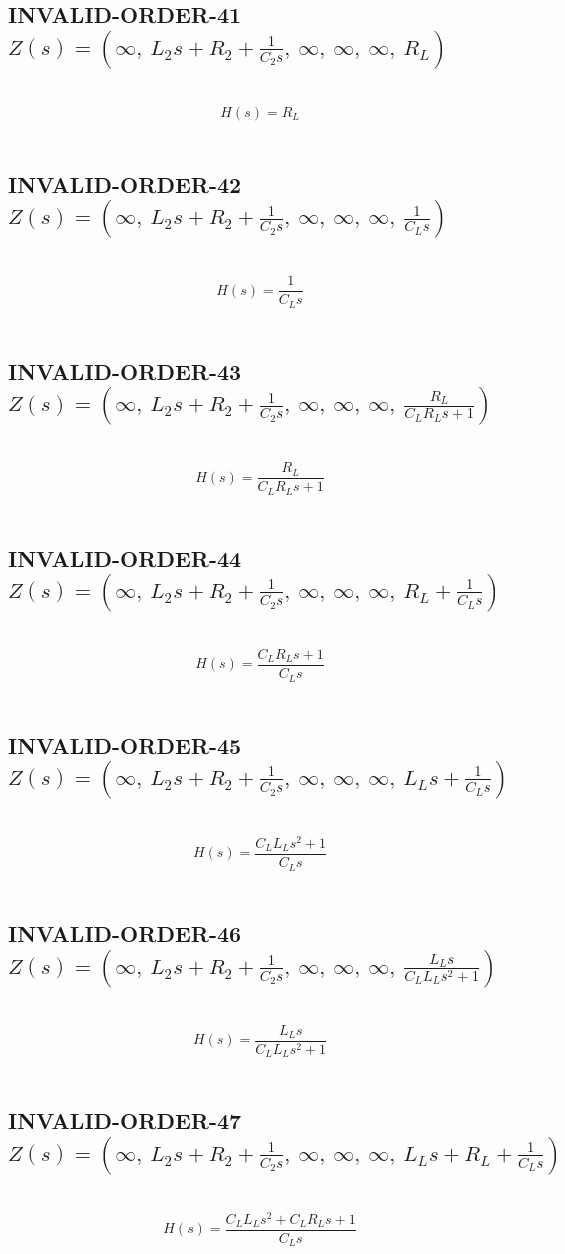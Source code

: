 \documentclass{article}
\begin{document}
\subsection{INVALID-ORDER-41 $Z(s) = \left( \infty, \  L_{2} s + R_{2} + \frac{1}{C_{2} s}, \  \infty, \  \infty, \  \infty, \  R_{L}\right)$ } \ 
\textbf{\[H(s) = R_{L}\] } \ 
\subsection{INVALID-ORDER-42 $Z(s) = \left( \infty, \  L_{2} s + R_{2} + \frac{1}{C_{2} s}, \  \infty, \  \infty, \  \infty, \  \frac{1}{C_{L} s}\right)$ } \ 
\textbf{\[H(s) = \frac{1}{C_{L} s}\] } \ 
\subsection{INVALID-ORDER-43 $Z(s) = \left( \infty, \  L_{2} s + R_{2} + \frac{1}{C_{2} s}, \  \infty, \  \infty, \  \infty, \  \frac{R_{L}}{C_{L} R_{L} s + 1}\right)$ } \ 
\textbf{\[H(s) = \frac{R_{L}}{C_{L} R_{L} s + 1}\] } \ 
\subsection{INVALID-ORDER-44 $Z(s) = \left( \infty, \  L_{2} s + R_{2} + \frac{1}{C_{2} s}, \  \infty, \  \infty, \  \infty, \  R_{L} + \frac{1}{C_{L} s}\right)$ } \ 
\textbf{\[H(s) = \frac{C_{L} R_{L} s + 1}{C_{L} s}\] } \ 
\subsection{INVALID-ORDER-45 $Z(s) = \left( \infty, \  L_{2} s + R_{2} + \frac{1}{C_{2} s}, \  \infty, \  \infty, \  \infty, \  L_{L} s + \frac{1}{C_{L} s}\right)$ } \ 
\textbf{\[H(s) = \frac{C_{L} L_{L} s^{2} + 1}{C_{L} s}\] } \ 
\subsection{INVALID-ORDER-46 $Z(s) = \left( \infty, \  L_{2} s + R_{2} + \frac{1}{C_{2} s}, \  \infty, \  \infty, \  \infty, \  \frac{L_{L} s}{C_{L} L_{L} s^{2} + 1}\right)$ } \ 
\textbf{\[H(s) = \frac{L_{L} s}{C_{L} L_{L} s^{2} + 1}\] } \ 
\subsection{INVALID-ORDER-47 $Z(s) = \left( \infty, \  L_{2} s + R_{2} + \frac{1}{C_{2} s}, \  \infty, \  \infty, \  \infty, \  L_{L} s + R_{L} + \frac{1}{C_{L} s}\right)$ } \ 
\textbf{\[H(s) = \frac{C_{L} L_{L} s^{2} + C_{L} R_{L} s + 1}{C_{L} s}\] } \ 
\end{document}
